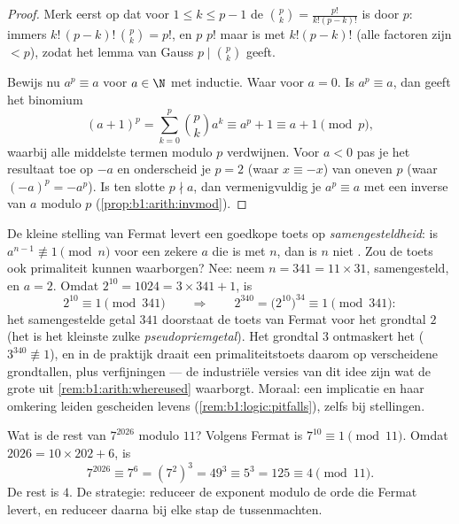 \begin{proof}
Merk eerst op dat voor $1 \leq k \leq p - 1$ de 
$\binom pk = \frac{p!}{k!(p-k)!}$  is door $p$: immers
$k!\,(p-k)!\, \binom pk = p!$, en $p$  $p!$ maar is 
met $k!(p-k)!$ (alle factoren zijn $< p$), zodat het lemma van Gauss $p
\mid \binom pk$ geeft.

Bewijs nu $a^p \equiv a$ voor $a \in \N$ met inductie. Waar voor $a = 0$.
Is $a^p \equiv a$, dan geeft het binomium
\[
(a+1)^p = \sum_{k=0}^{p} \binom pk a^k
\equiv a^p + 1 \equiv a + 1 \pmod p,
\]
waarbij alle middelste termen modulo $p$ verdwijnen. Voor $a < 0$ pas je
het resultaat toe op $-a$ en onderscheid je $p = 2$ (waar $x \equiv -x$)
van oneven $p$ (waar $(-a)^p = -a^p$). Is ten slotte $p \nmid a$, dan
vermenigvuldig je $a^p \equiv a$ met een inverse van $a$ modulo $p$
(\cref{prop:b1:arith:invmod}).
\end{proof}

\begin{example}\label{ex:b1:arith:pseudoprime}
De kleine stelling van Fermat levert een goedkope toets op
\emph{samengesteldheid}: is $a^{n-1} \not\equiv 1 \pmod n$ voor een
zekere $a$ die  is met $n$, dan is $n$ niet . Zou de
toets ook primaliteit kunnen waarborgen? Nee: neem $n = 341 = 11 \times
31$, samengesteld, en $a = 2$. Omdat $2^{10} = 1024 = 3 \times 341 + 1$,
is
\[
2^{10} \equiv 1 \pmod{341}
\qquad\Longrightarrow\qquad
2^{340} = \bigl(2^{10}\bigr)^{34} \equiv 1 \pmod{341} :
\]
het samengestelde getal $341$ doorstaat de toets van Fermat voor het
grondtal $2$ (het is het kleinste zulke \emph{pseudopriemgetal}). Het
grondtal $3$ ontmaskert het ($3^{340} \not\equiv 1$), en in de praktijk
draait een primaliteitstoets daarom op verscheidene grondtallen, plus
verfijningen --- de industriële versies van dit idee zijn wat de grote
 uit \cref{rem:b1:arith:whereused} waarborgt. Moraal: een
implicatie en haar omkering leiden gescheiden levens
(\cref{rem:b1:logic:pitfalls}), zelfs bij stellingen.
\end{example}

\begin{example}\label{ex:b1:arith:congruences}
Wat is de rest van $7^{2026}$ modulo $11$? Volgens Fermat is $7^{10}
\equiv 1 \pmod{11}$. Omdat $2026 = 10 \times 202 + 6$, is
\[
7^{2026} \equiv 7^6 = (7^2)^3 = 49^3 \equiv 5^3 = 125 \equiv 4
\pmod{11}.
\]
De rest is $4$. De strategie: reduceer de exponent modulo de orde die
Fermat levert, en reduceer daarna bij elke stap de tussenmachten.
\end{example}

